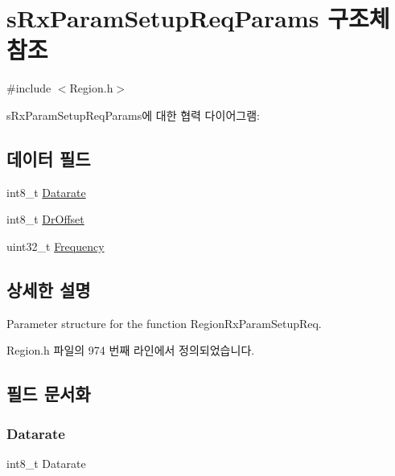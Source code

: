 \hypertarget{structs_rx_param_setup_req_params}{}\section{s\+Rx\+Param\+Setup\+Req\+Params 구조체 참조}
\label{structs_rx_param_setup_req_params}


{\ttfamily \#include $<$Region.\+h$>$}



s\+Rx\+Param\+Setup\+Req\+Params에 대한 협력 다이어그램\+:
\subsection*{데이터 필드}
\begin{DoxyCompactItemize}
\item 
int8\+\_\+t \mbox{\hyperlink{structs_rx_param_setup_req_params_ae2f6080f3aa0e9485c55513ca56bb24d}{Datarate}}
\item 
int8\+\_\+t \mbox{\hyperlink{structs_rx_param_setup_req_params_ad920e18a48423b1eb1fe40d1b2b082d4}{Dr\+Offset}}
\item 
uint32\+\_\+t \mbox{\hyperlink{structs_rx_param_setup_req_params_ade3d190636488dad9a89b19446b7acf1}{Frequency}}
\end{DoxyCompactItemize}


\subsection{상세한 설명}
Parameter structure for the function Region\+Rx\+Param\+Setup\+Req. 

Region.\+h 파일의 974 번째 라인에서 정의되었습니다.



\subsection{필드 문서화}
\mbox{\label{structs_rx_param_setup_req_params_ae2f6080f3aa0e9485c55513ca56bb24d}} 
\subsubsection{\texorpdfstring{Datarate}{Datarate}}
{\footnotesize\ttfamily int8\+\_\+t Datarate}

